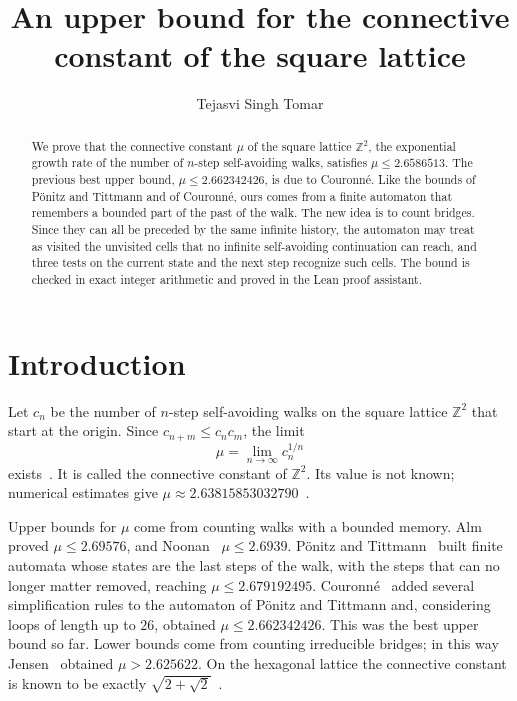 \documentclass[11pt]{amsart}
\theoremstyle{definition}
\theoremstyle{remark}
\numberwithin{equation}{section}
\newcommand{\Z}{\mathbb{Z}}
\newcommand{\MuUB}{2.6586513}
\newcommand{\CouUB}{2.662342426}
\begin{document}
\title{An upper bound for the connective constant of the square lattice}
\author{Tejasvi Singh Tomar}
\renewcommand{\urladdrname}{{\itshape ORCID}}

\begin{abstract}
We prove that the connective constant $\mu$ of the square lattice $\Z^2$, the exponential growth rate of the number of $n$-step self-avoiding walks, satisfies $\mu\le\MuUB$. The previous best upper bound, $\mu\le\CouUB$, is due to Couronn\'e. Like the bounds of P\"onitz and Tittmann and of Couronn\'e, ours comes from a finite automaton that remembers a bounded part of the past of the walk. The new idea is to count bridges. Since they can all be preceded by the same infinite history, the automaton may treat as visited the unvisited cells that no infinite self-avoiding continuation can reach, and three tests on the current state and the next step recognize such cells. The bound is checked in exact integer arithmetic and proved in the Lean proof assistant.
\end{abstract}

\maketitle

\section{Introduction}\label{sec:intro}

Let $c_n$ be the number of $n$-step self-avoiding walks on the square lattice $\Z^2$ that start at the origin. Since $c_{n+m}\le c_nc_m$, the limit
\[
\mu=\lim_{n\to\infty}c_n^{1/n}
\]
exists~\cite{HaMo54}. It is called the connective constant of $\Z^2$. Its value is not known; numerical estimates give $\mu\approx2.63815853032790$~\cite{JSG16}.

Upper bounds for $\mu$ come from counting walks with a bounded memory. Alm~\cite{Alm93} proved $\mu\le2.69576$, and Noonan~\cite{Noo98} $\mu\le2.6939$. P\"onitz and Tittmann~\cite{PT00} built finite automata whose states are the last steps of the walk, with the steps that can no longer matter removed, reaching $\mu\le2.679192495$. Couronn\'e~\cite{Cou25} added several simplification rules to the automaton of P\"onitz and Tittmann and, considering loops of length up to $26$, obtained $\mu\le\CouUB$. This was the best upper bound so far. Lower bounds come from counting irreducible bridges; in this way Jensen~\cite{Jen04} obtained $\mu>2.625622$. On the hexagonal lattice the connective constant is known to be exactly $\sqrt{2+\sqrt2}$~\cite{DCS12}.
\end{document}
